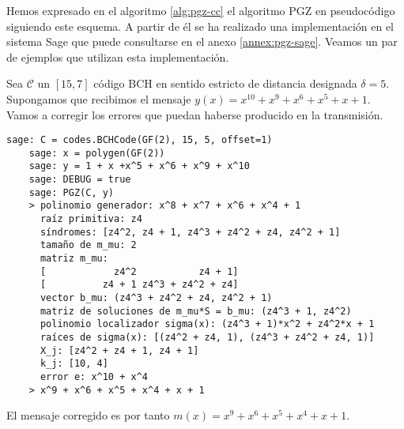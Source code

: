 Hemos expresado en el algoritmo \ref{alg:pgz-cc} el algoritmo PGZ en pseudocódigo siguiendo este esquema.
A partir de él se ha realizado una implementación en el sistema Sage que puede consultarse en el anexo \ref{annex:pgz-sage}.
Veamos un par de ejemplos que utilizan esta implementación.

\begin{example}
  Sea \(\mathcal C\) un \([15, 7]\) código BCH en sentido estricto de distancia designada \(\delta = 5\).
  Supongamos que recibimos el mensaje \(y(x) = x^{10} + x^9 + x^6 + x^5 + x + 1\).
  Vamos a corregir los errores que puedan haberse producido en la transmisión.
  \begin{lstlisting}[gobble=4]
    sage: C = codes.BCHCode(GF(2), 15, 5, offset=1)
    sage: x = polygen(GF(2))
    sage: y = 1 + x +x^5 + x^6 + x^9 + x^10
    sage: DEBUG = true
    sage: PGZ(C, y)
    > polinomio generador: x^8 + x^7 + x^6 + x^4 + 1
      raíz primitiva: z4
      síndromes: [z4^2, z4 + 1, z4^3 + z4^2 + z4, z4^2 + 1]
      tamaño de m_mu: 2
      matriz m_mu: 
      [            z4^2           z4 + 1]
      [          z4 + 1 z4^3 + z4^2 + z4]
      vector b_mu: (z4^3 + z4^2 + z4, z4^2 + 1)
      matriz de soluciones de m_mu*S = b_mu: (z4^3 + 1, z4^2)
      polinomio localizador sigma(x): (z4^3 + 1)*x^2 + z4^2*x + 1
      raíces de sigma(x): [(z4^2 + z4, 1), (z4^3 + z4^2 + z4, 1)]
      X_j: [z4^2 + z4 + 1, z4 + 1]
      k_j: [10, 4]
      error e: x^10 + x^4
    > x^9 + x^6 + x^5 + x^4 + x + 1
  \end{lstlisting}
  El mensaje corregido es por tanto \(m(x) = x^9 + x^6 + x^5 + x^4 + x + 1\).
\end{example}

